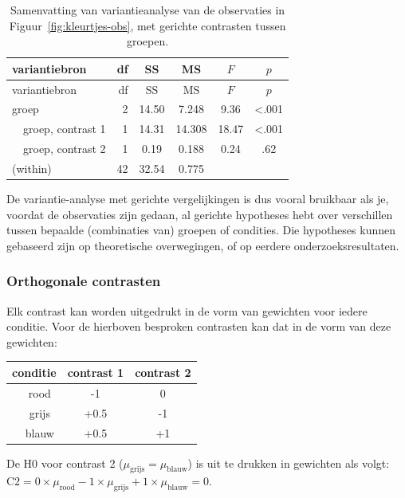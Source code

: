 \documentclass[
]{book}
\begin{document}
\begin{longtable}[]{@{}lrcccc@{}}
\caption{\label{tab:kleurtjes-anova-contrast} Samenvatting van variantieanalyse van de observaties in Figuur~\ref{fig:kleurtjes-obs}, met gerichte contrasten tussen groepen.}\tabularnewline
\toprule\noalign{}
variantiebron & df & SS & MS & \(F\) & \(p\) \\
\midrule\noalign{}
\endfirsthead
\toprule\noalign{}
variantiebron & df & SS & MS & \(F\) & \(p\) \\
\midrule\noalign{}
\endhead
\bottomrule\noalign{}
\endlastfoot
groep & 2 & 14.50 & 7.248 & 9.36 & \textless.001 \\
~~groep, contrast 1 & 1 & 14.31 & 14.308 & 18.47 & \textless.001 \\
~~groep, contrast 2 & 1 & 0.19 & 0.188 & 0.24 & .62 \\
(within) & 42 & 32.54 & 0.775 & & \\
\end{longtable}

De variantie-analyse met gerichte vergelijkingen is dus vooral bruikbaar
als je, voordat de observaties zijn gedaan, al gerichte hypotheses hebt
over verschillen tussen bepaalde (combinaties van) groepen of condities.
Die hypotheses kunnen gebaseerd zijn op theoretische overwegingen, of op
eerdere onderzoeksresultaten.

\subsubsection{Orthogonale contrasten}\label{sec:anova-oneway-contrasts}

Elk contrast kan worden uitgedrukt in de vorm van gewichten voor iedere
conditie. Voor de hierboven besproken contrasten kan dat in de vorm van
deze gewichten:

\begin{longtable}[]{@{}ccc@{}}
\toprule\noalign{}
conditie & contrast 1 & contrast 2 \\
\midrule\noalign{}
\endhead
\bottomrule\noalign{}
\endlastfoot
~~rood & -1 & 0 \\
~~grijs & +0.5 & -1 \\
~~blauw & +0.5 & +1 \\
\end{longtable}

De H0 voor contrast 2 (\(\mu_\textrm{grijs} = \mu_\textrm{blauw}\)) is uit
te drukken in gewichten als volgt:
\(\textrm{C2} = 0\times \mu_\textrm{rood} -1 \times \mu_\textrm{grijs} +1 \times \mu_\textrm{blauw} = 0\).
\end{document}
